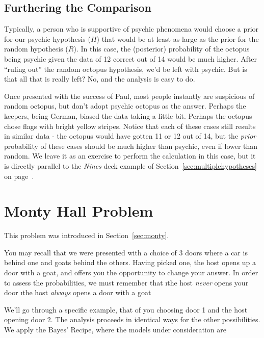 \subsection{Furthering the Comparison}

Typically, a person who is supportive of psychic phenomena would choose a prior for our psychic hypothesis ($H$) that would be at least as large as the prior for the random hypothesis ($R$).  In this case, the (posterior) probability of the octopus being psychic given the data of 12 correct out of 14 would be much higher.  After ``ruling out'' the random octopus hypothesis, we'd be left with psychic.  But is that all that is really left?  No, and the analysis is easy to do.  

Once presented with the success of Paul, most people instantly are suspicious of random octopus, but don't adopt psychic octopus as the answer.  Perhaps the keepers, being German, biased the data taking a little bit.  Perhaps the octopus chose flags with bright yellow stripes.  Notice that each of these cases still results in  similar data - the octopus would have gotten 11 or 12 out of 14, but the \emph{prior} probability of these cases should be much higher than psychic, even if lower than random.  We leave it as an exercise to perform the calculation in this case, but it is directly parallel to the \emph{Nines} deck example of Section~\ref{sec:multiplehypotheses} on page~\pageref{sec:multiplehypotheses}.




\section{Monty Hall Problem}\label{sec:monty_models}

This problem was introduced in Section~\ref{sec:monty}. 


 You may recall that we were presented with a choice of 3 doors where a car is behind one and goats behind the others. Having picked one, the host opens up a door with a goat, and offers you the opportunity to change your answer.  In order to assess the probabilities, we must remember that 
\be
\i the host {\em never} opens your door
\i the host {\em always} opens a door with a goat
\ee

We'll go through a specific example, that of you choosing door 1 and the host opening door 2.  The analysis proceeds in identical ways for the other possibilities.  We apply the Bayes' Recipe, where the models under consideration are 

